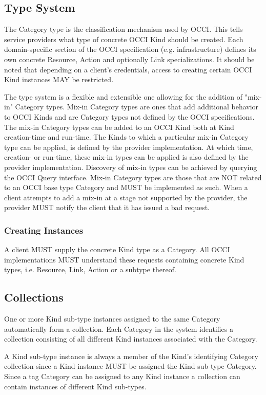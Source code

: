\documentclass[10pt,a4paper]{article}
\begin{document}
\subsection{Type System}
\label{sec:type_system}
The Category type is the classification mechanism used by OCCI. This
tells service providers what type of concrete OCCI Kind should be
created. Each domain-specific section of the OCCI specification
(e.g. infrastructure) defines its own concrete Resource, Action and
optionally Link specializations. It should be noted that depending on
a client's credentials, access to creating certain OCCI Kind instances
MAY be restricted.

The type system is a flexible and extensible one allowing for the
addition of "mix-in" Category types. Mix-in Category types are ones
that add additional behavior to OCCI Kinds and are Category types not
defined by the OCCI specifications. The mix-in Category types can be
added to an OCCI Kind both at Kind creation-time and run-time. The
Kinds to which a particular mix-in Category type can be applied, is
defined by the provider implementation. At which time, creation- or
run-time, these mix-in types can be applied is also defined by the
provider implementation. Discovery of mix-in types can be achieved by
querying the OCCI Query interface. Mix-in Category types are those
that are NOT related to an OCCI base type Category and MUST be
implemented as such. When a client attempts to add a mix-in at a stage
not supported by the provider, the provider MUST notify the client
that it has issued a bad request.

\subsubsection{Creating Instances}
A client MUST supply the concrete Kind type as a Category. All OCCI
implementations MUST understand these requests containing concrete
Kind types, i.e. Resource, Link, Action or a subtype thereof.

\subsection{Collections}
\label{sec:collection}
One or more Kind sub-type instances assigned to the same Category
automatically form a collection. Each Category in the system
identifies a collection consisting of all different Kind instances
associated with the Category.

A Kind sub-type instance is always a member of the Kind's identifying
Category collection since a Kind instance MUST be assigned the Kind
sub-type Category.  Since a tag Category can be assigned to any Kind
instance a collection can contain instances of different Kind
sub-types.
\end{document}
